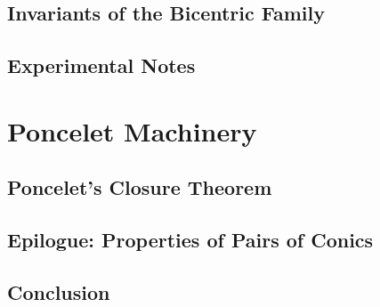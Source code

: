 \documentclass{book}
\begin{document}
\chapter[Bicentric Invariants]{Invariants of the Bicentric Family}
%

\chapter{ Experimental Notes}
%

\part{Poncelet Machinery}

\chapter{Poncelet's Closure Theorem}
% 

\chapter{Epilogue: Properties of Pairs of Conics}
%

\chapter{Conclusion}


\appendix


\backmatter

\sloppy
\printbibliography


\end{document}
